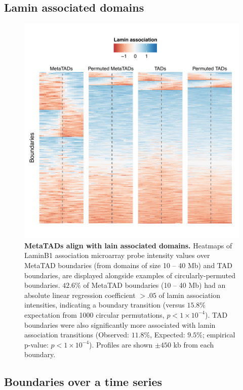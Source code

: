\documentclass[a4paper,10pt,oneside]{book}
\begin{document}
\subsection{Lamin associated domains}

\begin{figure}
\begin{center} 
\includegraphics[width=.9\textwidth]{figs/mt_laminperm.pdf}
\captionsetup{width=\textwidth}
\caption{ {\bf MetaTADs align with lain associated domains.}
Heatmaps of LaminB1 association microarray probe intensity values over MetaTAD boundaries (from domains of size 10 -- 40 Mb) and TAD boundaries, are displayed alongside examples of circularly-permuted boundaries. $42.6\%$ of MetaTAD boundaries (10 -- 40 Mb) had an absolute linear regression coefficient $>.05$ of lamin association intensities, indicating a boundary transition (versus $15.8\%$ expectation from 1000 circular permutations, $p < 1 \times 10^{-4}$). TAD boundaries were also significantly more associated with lamin association transitions (Observed: $11.8\%$, Expected: $9.5\%$; empirical p-value: $p < 1 \times 10^{-4}$). Profiles are shown $\pm450$ kb from each boundary.
}\label{fig:mtlamin}
\end{center}
\end{figure} 

\subsection{Boundaries over a time series}
\end{document}
